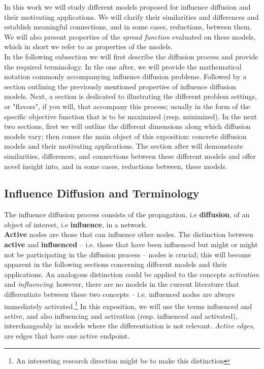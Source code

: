 \documentclass[twocolumn, 10pt]{article}
\begin{document}
In this work we will study different models proposed for influence diffusion and their motivating applications. We will clarify their similarities and differences and establish meaningful connections, and in some cases, reductions, between them. We will also present properties of the \textit{spread function} evaluated on these models, which in short we refer to as properties of the models.\\
In the following subsection we will first describe the diffusion process and provide the required terminology. In the one after, we will provide the mathematical notation commonly accompanying influence diffusion problems. Followed by a section outlining the previously mentioned properties of influence diffusion models. Next, a section is dedicated to illustrating the different problem settings, or "flavors", if you will, that accompany this process; usually in the form of the specific objective function that is to be maximized (resp. minimized). In the next two sections, first we will outline the different dimensions along which diffusion models vary; then comes the main object of this exposition: concrete diffusion models and their motivating applications. The section after will demonstrate similarities, differences, and connections between these different models and offer novel insight into, and in some cases, reductions between, these models. \\

\subsection{Influence Diffusion and Terminology}
The influence diffusion process consists of the propagation, i.e \textbf{diffusion}, of an object of interest, i.e \textbf{influence}, in a network. \\ 
\textbf{Active} nodes are those that can influence other nodes. The distinction between \textbf{active} and \textbf{influenced} -- i.e. those that have been influenced but might or might not be participating in the diffusion process -- nodes is crucial; this will become apparent in the following sections concerning different models and their applications. An analogous distinction could be applied to the concepts \textit{activation} and \textit{influencing}; however, there are no models in the current literature that differentiate between these two concepts -- i.e. influenced nodes are always immediately activated.\footnote{An interesting research direction might be to make this distinction}  In this exposition, we will use the terms influenced and active, and also influencing and activation (resp. influenced and activated), interchangeably in models where the differentiation is not relevant. \textit{Active edges}, are edges that have one active endpoint.
\end{document}
